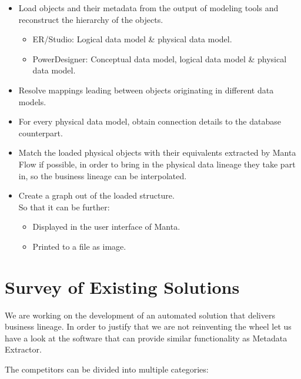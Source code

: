 \begin{itemize}
	\item Load objects and their metadata from the output of modeling tools and reconstruct the hierarchy of the objects.
	\begin{itemize}
		\item ER/Studio: Logical data model \& physical data model.
		\item PowerDesigner:  Conceptual data model, logical data model \& physical data model.
	\end{itemize}
	\item Resolve mappings leading between objects originating in different data models.
	\item For every physical data model, obtain connection details to the database counterpart.
	\item Match the loaded physical objects with their equivalents extracted by Manta Flow if possible, in order to bring in the physical data lineage they take part in, so the business lineage can be interpolated.
	\item Create a graph out of the loaded structure. \\
	So that it can be further:
	\begin{itemize}
		\item Displayed in the user interface of Manta.
		\item Printed to a file as image.
	\end{itemize}
\end{itemize}


\section{Survey of Existing Solutions}

We are working on the development of an automated solution that delivers business lineage.
In order to justify that we are not reinventing the wheel let us have a look at the software that can provide similar functionality as Metadata Extractor.

The competitors can be divided into multiple categories:

